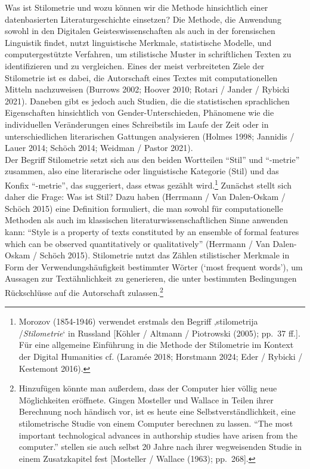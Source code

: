 \documentclass[
  12pt,
  letterpaper,
  DIV=11,
  numbers=noendperiod]{scrreprt}
\begin{document}
Was ist Stilometrie und wozu können wir die Methode hinsichtlich einer
datenbasierten Literaturgeschichte einsetzen? Die Methode, die Anwendung
sowohl in den Digitalen Geisteswissenschaften als auch in der
forensischen Linguistik findet, nutzt linguistische Merkmale,
statistische Modelle, und computergestützte Verfahren, um stilistische
Muster in schriftlichen Texten zu identifizieren und zu vergleichen.
Eines der meist verbreiteten Ziele der Stilometrie
ist es dabei, die Autorschaft eines Textes mit computationellen Mitteln
nachzuweisen (Burrows 2002; Hoover 2010; Rotari / Jander / Rybicki
2021). Daneben gibt es jedoch auch Studien, die die statistischen
sprachlichen Eigenschaften hinsichtlich von Gender-Unterschieden,
Phänomene wie die individuellen Veränderungen eines Schreibstils im
Laufe der Zeit oder in unterschiedlichen literarischen Gattungen
analysieren (Holmes 1998; Jannidis / Lauer 2014; Schöch 2014; Weidman /
Pastor 2021).\\
Der Begriff Stilometrie setzt sich aus den beiden Wortteilen ``Stil''
und ``-metrie'' zusammen, also eine literarische oder linguistische
Kategorie (Stil) und das Konfix ``-metrie'', das suggeriert, dass etwas
gezählt wird.\footnote{Morozov (1854-1946) verwendet erstmals den
  Begriff ‚stilometrija /\emph{Stilometrie}` in Russland {[}Köhler /
  Altmann / Piotrowski (2005); pp.~37 ff.{]}. Für eine allgemeine
  Einführung in die Methode der Stilometrie im Kontext der Digital
  Humanities cf. (Laramée 2018; Horstmann 2024; Eder / Rybicki /
  Kestemont 2016).} Zunächst stellt sich daher die Frage: Was ist Stil?
Dazu haben (Herrmann / Van Dalen-Oskam / Schöch 2015) eine Definition
formuliert, die man sowohl für computationelle Methoden als auch im
klassischen literaturwissenschaftlichen Sinne anwenden kann: ``Style is
a property of texts constituted by an ensemble of formal features which
can be observed quantitatively or qualitatively'' (Herrmann / Van
Dalen-Oskam / Schöch 2015). Stilometrie nutzt das Zählen stilistischer
Merkmale in Form der Verwendungshäufigkeit bestimmter Wörter (`most
frequent words'), um Aussagen zur Textähnlichkeit zu generieren, die
unter bestimmten Bedingungen Rückschlüsse auf die Autorschaft
zulassen.\footnote{Hinzufügen könnte man außerdem, dass der Computer
  hier völlig neue Möglichkeiten eröffnete. Gingen Mosteller und Wallace
  in Teilen ihrer Berechnung noch händisch vor, ist es heute eine
  Selbstverständlichkeit, eine stilometrische Studie von einem Computer
  berechnen zu lassen. ``The most important technological advances in
  authorship studies have arisen from the computer.'' stellen sie auch
  selbst 20 Jahre nach ihrer wegweisenden Studie in einem Zusatzkapitel
  fest {[}Mosteller / Wallace (1963); pp.~268{]}.}
\end{document}
